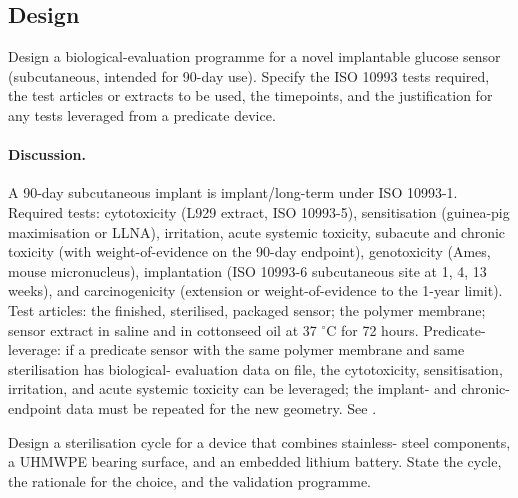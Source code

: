 \subsection*{Design}

\begin{exercise}
Design a biological-evaluation programme for a novel implantable
glucose sensor (subcutaneous, intended for 90-day use). Specify
the ISO 10993 tests required, the test articles or extracts to be
used, the timepoints, and the justification for any tests
leveraged from a predicate device.
\end{exercise}

\paragraph{Discussion.}
A 90-day subcutaneous implant is implant/long-term under ISO
10993-1. Required tests: cytotoxicity (L929 extract, ISO 10993-5),
sensitisation (guinea-pig maximisation or LLNA), irritation,
acute systemic toxicity, subacute and chronic toxicity (with
weight-of-evidence on the 90-day endpoint), genotoxicity (Ames,
mouse micronucleus), implantation (ISO 10993-6 subcutaneous site
at 1, 4, 13 weeks), and carcinogenicity (extension or
weight-of-evidence to the 1-year limit). Test articles: the
finished, sterilised, packaged sensor; the polymer membrane;
sensor extract in saline and in cottonseed oil at 37 $^{\circ}$C
for 72 hours. Predicate-leverage: if a predicate sensor with the
same polymer membrane and same sterilisation has biological-
evaluation data on file, the cytotoxicity, sensitisation,
irritation, and acute systemic toxicity can be leveraged; the
implant- and chronic-endpoint data must be repeated for the new
geometry. See \cite{std:v6c12-iso-10993-1-2018,
std:v6c12-iso-10993-6-2016}.

\begin{exercise}
Design a sterilisation cycle for a device that combines stainless-
steel components, a UHMWPE bearing surface, and an embedded
lithium battery. State the cycle, the rationale for the choice,
and the validation programme.
\end{exercise}

